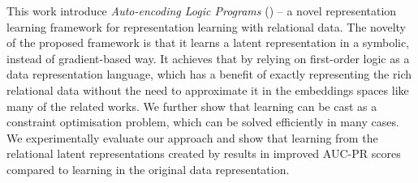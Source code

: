 This work introduce \textit{Auto-encoding Logic Programs} () -- a novel representation learning framework for representation learning with relational data.
The novelty of the proposed framework is that it learns a latent representation in a symbolic, instead of gradient-based way.
It achieves that by relying on first-order logic as a data representation language, which has a benefit of exactly representing the rich relational data without the need to approximate it in the embeddings spaces like many of the related works.
We further show that learning  can be cast as a constraint optimisation problem, which can be solved efficiently in many cases.
We experimentally evaluate our approach and show that learning from the relational latent representations created by  results in improved AUC-PR scores compared to learning in the original data representation.


\cleardoublepage

